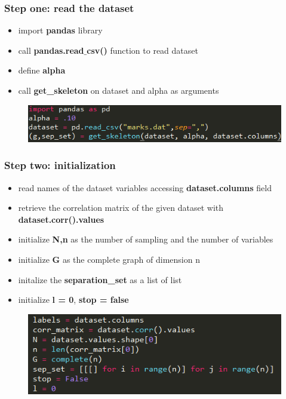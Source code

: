 \documentclass[xcolor ={table,usenames,dvipsnames}]{beamer}
\theoremstyle{definition}
\begin{document}
	\begin{frame}
		\frametitle{Step one: read the dataset}
		\begin{itemize}
			\item import \textbf{pandas} library
			\item call \textbf{pandas.read$\_$csv()} function to read dataset
			\item define \textbf{alpha}
			\item call \textbf{get\_skeleton} on dataset and alpha as arguments
		\end{itemize}
		\begin{figure}[h!]
			\centering
			\includegraphics[scale=0.5]{img/dataset.PNG}
		\end{figure}
		
	\end{frame}
	\begin{frame}
\frametitle{Step two: initialization}
\begin{itemize}
	\item read names of the dataset variables accessing \textbf{dataset.columns} field
	\item retrieve the correlation matrix of the given dataset with \textbf{dataset.corr().values}
	\item initialize \textbf{N,n} as the number of sampling and the number of variables
	\item initialize \textbf{G} as the complete graph of dimension n
	\item initalize the \textbf{separation\_set} as a list of list
	\item initialize \textbf{l = 0}, \textbf{stop = false}
\end{itemize}
	\begin{figure}[h!]
		\centering
		\includegraphics[scale=0.5]{img/initialization.PNG}
	\end{figure}

\end{frame}
\end{document}
